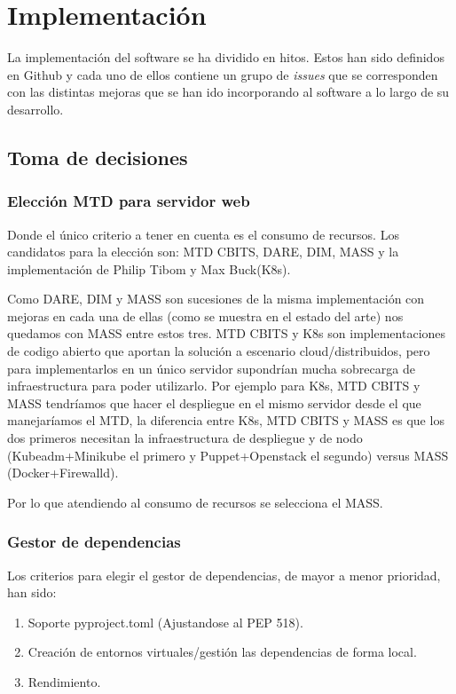 \chapter{Implementación}

La implementación del software se ha dividido en hitos. Estos han sido definidos en Github
y cada uno de ellos contiene un grupo de \textit{issues} que se corresponden con las distintas
mejoras que se han ido incorporando al software a lo largo de su desarrollo.

\section{Toma de decisiones}

\subsection{Elección MTD para servidor web}
Donde el único criterio a tener en cuenta es el consumo de recursos.
Los candidatos para la elección son: MTD CBITS, DARE, DIM, MASS y la implementación de Philip Tibom y Max Buck\cite{MTD-gotemburgo}(K8s).

Como DARE, DIM y MASS son sucesiones de la misma implementación con mejoras en cada una de ellas (como se muestra en el estado del arte) nos quedamos con MASS entre estos tres.
MTD CBITS y K8s son implementaciones de codigo abierto que aportan la solución a escenario cloud/distribuidos, pero para implementarlos en un único servidor supondrían mucha sobrecarga de infraestructura para poder utilizarlo. Por ejemplo para K8s, MTD CBITS y MASS tendríamos que hacer el despliegue en el mismo servidor desde el que manejaríamos el MTD, la diferencia entre K8s, MTD CBITS y MASS es que los dos primeros necesitan la infraestructura de despliegue y de nodo (Kubeadm+Minikube el primero y Puppet+Openstack el segundo) versus MASS (Docker+Firewalld). 

Por lo que atendiendo al consumo de recursos se selecciona el MASS.

\subsection{Gestor de dependencias}
Los criterios para elegir el gestor de dependencias, de mayor a menor prioridad, han sido:
\begin{enumerate}
    \item Soporte pyproject.toml (Ajustandose al PEP 518\cite{pep-pyproject}).
    \item Creación de entornos virtuales/gestión las dependencias de forma local.
    \item Rendimiento.
\end{enumerate}

